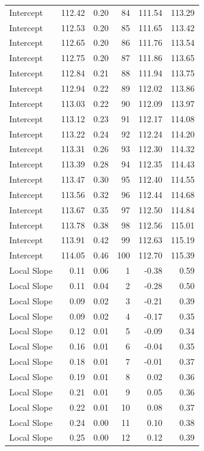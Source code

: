 \documentclass[
]{article}
\begin{document}
\begin{longtable}[]{@{}lrrrrr@{}}
Intercept & 112.42 & 0.20 & 84 & 111.54 & 113.29 \\
Intercept & 112.53 & 0.20 & 85 & 111.65 & 113.42 \\
Intercept & 112.65 & 0.20 & 86 & 111.76 & 113.54 \\
Intercept & 112.75 & 0.20 & 87 & 111.86 & 113.65 \\
Intercept & 112.84 & 0.21 & 88 & 111.94 & 113.75 \\
Intercept & 112.94 & 0.22 & 89 & 112.02 & 113.86 \\
Intercept & 113.03 & 0.22 & 90 & 112.09 & 113.97 \\
Intercept & 113.12 & 0.23 & 91 & 112.17 & 114.08 \\
Intercept & 113.22 & 0.24 & 92 & 112.24 & 114.20 \\
Intercept & 113.31 & 0.26 & 93 & 112.30 & 114.32 \\
Intercept & 113.39 & 0.28 & 94 & 112.35 & 114.43 \\
Intercept & 113.47 & 0.30 & 95 & 112.40 & 114.55 \\
Intercept & 113.56 & 0.32 & 96 & 112.44 & 114.68 \\
Intercept & 113.67 & 0.35 & 97 & 112.50 & 114.84 \\
Intercept & 113.78 & 0.38 & 98 & 112.56 & 115.01 \\
Intercept & 113.91 & 0.42 & 99 & 112.63 & 115.19 \\
Intercept & 114.05 & 0.46 & 100 & 112.70 & 115.39 \\
Local Slope & 0.11 & 0.06 & 1 & -0.38 & 0.59 \\
Local Slope & 0.11 & 0.04 & 2 & -0.28 & 0.50 \\
Local Slope & 0.09 & 0.02 & 3 & -0.21 & 0.39 \\
Local Slope & 0.09 & 0.02 & 4 & -0.17 & 0.35 \\
Local Slope & 0.12 & 0.01 & 5 & -0.09 & 0.34 \\
Local Slope & 0.16 & 0.01 & 6 & -0.04 & 0.35 \\
Local Slope & 0.18 & 0.01 & 7 & -0.01 & 0.37 \\
Local Slope & 0.19 & 0.01 & 8 & 0.02 & 0.36 \\
Local Slope & 0.21 & 0.01 & 9 & 0.05 & 0.36 \\
Local Slope & 0.22 & 0.01 & 10 & 0.08 & 0.37 \\
Local Slope & 0.24 & 0.00 & 11 & 0.10 & 0.38 \\
Local Slope & 0.25 & 0.00 & 12 & 0.12 & 0.39 \\

\end{longtable}
\end{document}
